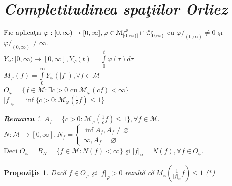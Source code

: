 \documentclass[ a4paper, 12pt]{report}
\newtheorem{prop}[theorem]{\bf Propozi\c tia }
\theoremstyle{definition}
\theoremstyle{remark}
\newtheorem{remarc}{\bf Remarca}[section]
\numberwithin{equation}{section}
\begin{document}
\newpage
\section{\textit{Completitudinea spa\c tiilor Orliez}}
Fie aplica\c tia $\varphi : [0,\infty) \rightarrow [0,\infty], \varphi \in \mathcal{M}_{[0,\infty)]}^{\mc} \cap \mathcal{C}_{[0,\infty)}^s$ cu $\varphi/_{(0,\infty)} \neq 0$ \c si $\varphi/_{(0,\infty)} \neq \infty.$\\
$Y_\varphi : [0,\infty) \rightarrow [0,\infty], Y_\varphi(t) = \int\limits_{0}^{t} \varphi(\tau) d \tau$\\
$M_\varphi(f) = \int\limits_{0}^{\infty} Y_\varphi(\lvert f \rvert), \forall f \in \mathcal{M}$\\
$O_\varphi = \{f \in \mathcal{M}: \exists c>0$ cu $\mathcal{M}_\varphi(cf)<\infty\}$\\
$\lvert f \rvert_\varphi = \inf\Big \{c>0:\mathcal{M}_\varphi(\frac{1}{c}f) \leq 1\Big \}$\\
\begin{remarc}
$A_f = \Big \{c>0: \mathcal{M}_\varphi(\frac{1}{c}f) \leq 1\Big \} , \forall f \in \mathcal{M}$.\\
$N : \mathcal{M} \rightarrow [0,\infty], N_f = \begin{cases}
\inf A_f, A_f \neq \varnothing\\
\infty, A_f = \varnothing
\end{cases}$ \\
Deci $O_\varphi = B_N = \{f \in \mathcal{M}: N(f)<\infty\}$ \c si $\lvert f \rvert_\varphi = N(f), \forall f \in O_\varphi.$
\end{remarc}
\begin{prop}
Dac\u a $f \in O_\varphi$ \c si $\lvert f \rvert_\varphi >0$ rezult\u a c\u a $ M_\varphi\left (\frac{1}{\lvert f \rvert_\varphi}f\right )\leq 1$ \hspace{1mm}($\ast$)
\end{prop}
\end{document}
